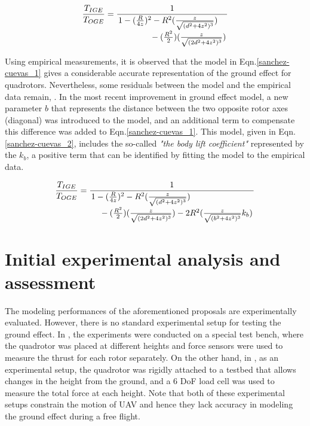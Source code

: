 \documentclass[twocolumn,10pt]{asme2ej}
\begin{document}
\begin{align}
  \frac{T_{IGE}}{T_{OGE}} = \frac{1}{\splitfrac{1 - (\frac{R}{4z})^{2} - R^{2}(\frac{z}{\sqrt{(d^{2}+4z^{2})^{3}}})} 
  {- (\frac{R^{2}}{2})(\frac{z}{\sqrt{(2d^{2}+4z^{2})^{3}}})}}  \label{sanchez-cuevas_1} 
\end{align}

Using empirical measurements, it is observed that the model in Eqn.\eqref{sanchez-cuevas_1} gives a considerable accurate representation of the ground effect for quadrotors. Nevertheless, some residuals between the model and the empirical data remain, \cite{Sanchez-Cuevas2017}. In the most recent improvement in ground effect model, a new parameter $b$ that represents the distance between the two opposite rotor axes (diagonal) was introduced to the model, and an additional term to compensate this difference was added to Eqn.\eqref{sanchez-cuevas_1}. This model, given in Eqn.\eqref{sanchez-cuevas_2}, includes the so-called \textit{"the body lift coefficient"} represented by the $k_{b}$, a positive term that can be identified by fitting the model to the empirical data.

\begin{align}
  \frac{T_{IGE}}{T_{OGE}} = \frac{1}{\splitfrac{1 - (\frac{R}{4z})^{2} - R^{2}(\frac{z}{\sqrt{(d^{2}+4z^{2})^{3}}})} {- (\frac{R^{2}}{2})(\frac{z}{\sqrt{(2d^{2}+4z^{2})^{3}}}) - 2R^{2}(\frac{z}{\sqrt{(b^{2}+4z^{2})^{3}}}k_{b})}}  \label{sanchez-cuevas_2}
\end{align}

\section{Initial experimental analysis and assessment}
The modeling performances of the aforementioned proposals are experimentally evaluated. However, there is no standard experimental setup for testing the ground effect. In \cite{Sanchez-Cuevas2017}, the experiments were conducted on a special test bench, where the quadrotor was placed at different heights and force sensors were used to measure the thrust for each rotor separately. On the other hand, in \cite{Bernard2017}, as an experimental setup, the quadrotor was rigidly attached to a testbed that allows changes in the height from the ground, and a 6 DoF load cell was used to measure the total force at each height. Note that both of these experimental setups constrain the motion of UAV and hence they lack accuracy in modeling the ground effect during a free flight.
\end{document}
